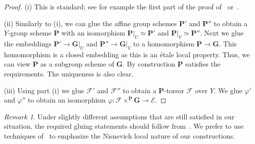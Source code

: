 \documentclass[11pt]{amsart}
\renewcommand{\phi}{\varphi}
\theoremstyle{plain}
\theoremstyle{definition}
\theoremstyle{remark}
\newtheorem{remark}[proposition]{Remark}
\newcommand\cE{{\mathcal{E}}}
\newcommand\cF{{\mathcal{F}}}
\newcommand\bG{{\mathbf G}}
\newcommand\bP{{\mathbf P}}
\begin{document}
\begin{proof}
(i) This is standard; see for example the first part of the proof of~\cite[Ch.~3, Prop.~1.4]{MorelVoevodsky} or~\cite[Sect.~5.4]{FedorovPanin}.

(ii) Similarly to (i), we can glue the affine group schemes $\bP'$ and $\bP''$ to obtain a $Y$-group scheme $\bP$ with an isomorphism $\bP|_U\simeq\bP'$ and $\bP|_V\simeq\bP''$. Next we glue the embeddings $\bP'\to\bG|_U$ and $\bP''\to\bG|_V$ to a homomorphism $\bP\to\bG$. This homomorphism is a closed embedding as this is an \'etale local property. Thus, we can view $\bP$ as a subgroup scheme of $\bG$. By construction $\bP$ satisfies the requirements. The uniqueness is also clear.

(iii) Using part (i) we glue $\cF'$ and $\cF''$ to obtain a $\bP$-torsor $\cF$ over $Y$. We glue $\phi'$ and $\phi''$ to obtain an isomorphism $\phi\colon\cF\times^\bP\bG\to\cE$.
\end{proof}

\begin{remark}
Under slightly different assumptions that are still satisfied in our situation, the required gluing statements should follow from~\cite[Prop.~4.2.1]{CesnaviciusProblems}. We prefer to use techniques of~\cite{MorelVoevodsky} to emphasize the Nisnevich local nature of our constructions.
\end{remark}
\end{document}

